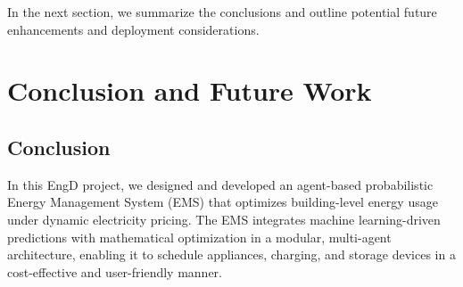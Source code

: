 \documentclass[12pt,a4paper]{article}
\begin{document}
In the next section, we summarize the conclusions and outline potential future enhancements and deployment considerations.

\clearpage

\section{Conclusion and Future Work}
\subsection*{Conclusion}
In this EngD project, we designed and developed an agent-based probabilistic Energy Management System (EMS) that optimizes building-level energy usage under dynamic electricity pricing. The EMS integrates machine learning-driven predictions with mathematical optimization in a modular, multi-agent architecture, enabling it to schedule appliances, charging, and storage devices in a cost-effective and user-friendly manner. 
\end{document}
